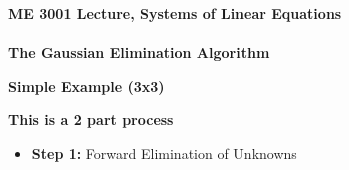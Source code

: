 \documentclass[11pt]{article}
\begin{document}
\textbf{ \LARGE ME 3001 Lecture, Systems of Linear Equations} \\\\
\textbf{ \LARGE The Gaussian Elimination Algorithm} \\


 \renewcommand\labelitemi{\textbullet}
 \renewcommand\labelitemii{\textendash}
 \renewcommand\labelitemiii{\textasteriskcentered}
 \renewcommand\labelitemiv{\textperiodcentered}
\begin{description}

\item \textbf{ Simple Example (3x3)}
\newpage
\Large
\item \textbf{ This is a 2 part process}
	
	
	\begin{itemize}
		\item {\bf Step 1:} Forward Elimination of Unknowns
		

\end{itemize}
\end{description}
\end{document}
